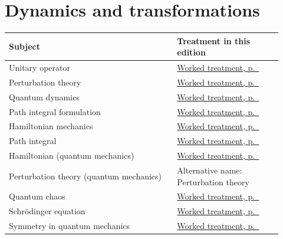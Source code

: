 \documentclass[11pt,oneside]{book}
\begin{document}
\section*{Dynamics and transformations}
\begin{longtable}{p{0.57\linewidth}p{0.35\linewidth}}
\toprule Subject & Treatment in this edition \\
\midrule\endhead
{}\label{index:unitary-operator}Unitary operator & \hyperref[topic:unitary-operator]{Worked treatment, p.~\pageref*{topic:unitary-operator}} \\
\label{index:perturbation-theory}Perturbation theory & \hyperref[topic:perturbation-theory]{Worked treatment, p.~\pageref*{topic:perturbation-theory}} \\
\label{index:quantum-dynamics}Quantum dynamics & \hyperref[topic:quantum-dynamics]{Worked treatment, p.~\pageref*{topic:quantum-dynamics}} \\
\label{index:path-integral-formulation}Path integral formulation & \hyperref[topic:path-integral-formulation]{Worked treatment, p.~\pageref*{topic:path-integral-formulation}} \\
\label{index:hamiltonian-mechanics}Hamiltonian mechanics & \hyperref[topic:hamiltonian-mechanics]{Worked treatment, p.~\pageref*{topic:hamiltonian-mechanics}} \\
\label{index:path-integral}Path integral & \hyperref[topic:path-integral]{Worked treatment, p.~\pageref*{topic:path-integral}} \\
\label{index:hamiltonian-quantum-mechanics}Hamiltonian (quantum mechanics) & \hyperref[topic:hamiltonian-quantum-mechanics]{Worked treatment, p.~\pageref*{topic:hamiltonian-quantum-mechanics}} \\
\label{index:perturbation-theory-quantum-mechanics}Perturbation theory (quantum mechanics) & Alternative name: Perturbation theory \\
\label{index:quantum-chaos}Quantum chaos & \hyperref[topic:quantum-chaos]{Worked treatment, p.~\pageref*{topic:quantum-chaos}} \\
\label{index:schr-dinger-equation}Schrödinger equation & \hyperref[topic:schr-dinger-equation]{Worked treatment, p.~\pageref*{topic:schr-dinger-equation}} \\
\label{index:symmetry-in-quantum-mechanics}Symmetry in quantum mechanics & \hyperref[topic:symmetry-in-quantum-mechanics]{Worked treatment, p.~\pageref*{topic:symmetry-in-quantum-mechanics}} \\

\end{longtable}
\end{document}
